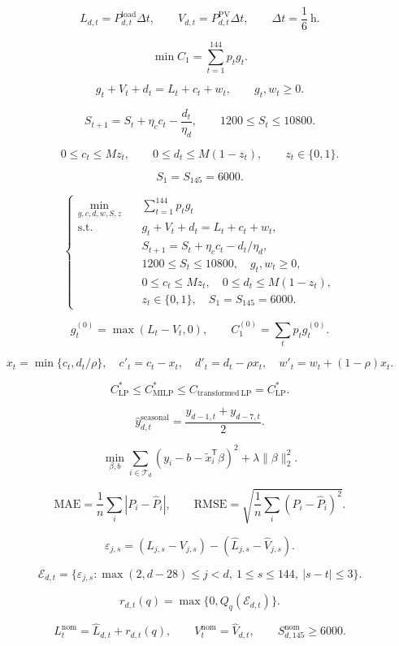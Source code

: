 \[
L_{d,t}=P^{\mathrm{load}}_{d,t}\Delta t,\qquad V_{d,t}=P^{\mathrm{PV}}_{d,t}\Delta t,\qquad \Delta t=\frac{1}{6}\ \mathrm{h}.
\]

\[
\min C_1=\sum_{t=1}^{144}p_tg_t.
\]

\[
g_t+V_t+d_t=L_t+c_t+w_t,\qquad g_t,w_t\geq0.
\]

\[
S_{t+1}=S_t+\eta_c c_t-\frac{d_t}{\eta_d},\qquad 1200\leq S_t\leq10800.
\]

\[
0\leq c_t\leq Mz_t,\qquad 0\leq d_t\leq M(1-z_t),\qquad z_t\in\{0,1\}.
\]

\[
S_1=S_{145}=6000.
\]

\[
\boxed{\left\{\begin{aligned}\min_{g,c,d,w,S,z}\quad &\sum_{t=1}^{144}p_tg_t\\\mathrm{s.t.}\quad &g_t+V_t+d_t=L_t+c_t+w_t,\\&S_{t+1}=S_t+\eta_c c_t-d_t/\eta_d,\\&1200\leq S_t\leq10800,\quad g_t,w_t\geq0,\\&0\leq c_t\leq Mz_t,\quad0\leq d_t\leq M(1-z_t),\\&z_t\in\{0,1\},\quad S_1=S_{145}=6000.\end{aligned}\right.}
\]

\[
g_t^{(0)}=\max(L_t-V_t,0),\qquad C_1^{(0)}=\sum_t p_tg_t^{(0)}.
\]

\[
x_t=\min\{c_t,d_t/\rho\},\quad c'_t=c_t-x_t,\quad d'_t=d_t-\rho x_t,\quad w'_t=w_t+(1-\rho)x_t.
\]

\[
C_{\mathrm{LP}}^{*}\le C_{\mathrm{MILP}}^{*}\le C_{\mathrm{transformed\ LP}}=C_{\mathrm{LP}}^{*}.
\]

\[
\hat y_{d,t}^{\mathrm{seasonal}}=\frac{y_{d-1,t}+y_{d-7,t}}{2}.
\]

\[
\min_{\beta,b}\sum_{i\in\mathcal T_d}(y_i-b-\widetilde{x}_i^{\mathsf T}\beta)^2+\lambda\|\beta\|_2^2.
\]

\[
\mathrm{MAE}=\frac{1}{n}\sum_i|P_i-\widehat P_i|,\qquad\mathrm{RMSE}=\sqrt{\frac{1}{n}\sum_i(P_i-\widehat P_i)^2}.
\]

\[
\varepsilon_{j,s}=(L_{j,s}-V_{j,s})-(\hat L_{j,s}-\hat V_{j,s}).
\]

\[
\mathcal E_{d,t}=\{\varepsilon_{j,s}:\max(2,d-28)\leq j<d,\ 1\leq s\leq144,\ |s-t|\leq3\}.
\]

\[
r_{d,t}(q)=\max\{0,Q_q(\mathcal E_{d,t})\}.
\]

\[
L_t^{\mathrm{nom}}=\hat L_{d,t}+r_{d,t}(q),\qquad V_t^{\mathrm{nom}}=\hat V_{d,t},\qquad S_{d,145}^{\mathrm{nom}}\geq6000.
\]

